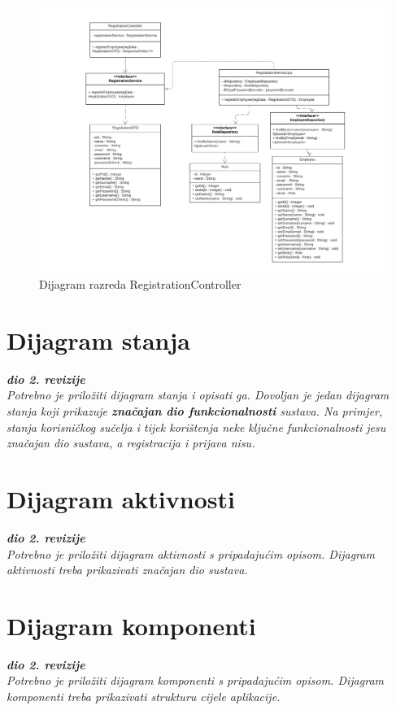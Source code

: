 			
			\eject
			\begin{figure}[H]
					\centering
					\includegraphics[width=\textwidth]{slike/fixRegistrationController.png}
					\caption{Dijagram razreda RegistrationController}
				\end{figure}
			
			
			\eject
			
		
		\section{Dijagram stanja}
			
			
			\textbf{\textit{dio 2. revizije}}\\
			
			\textit{Potrebno je priložiti dijagram stanja i opisati ga. Dovoljan je jedan dijagram stanja koji prikazuje \textbf{značajan dio funkcionalnosti} sustava. Na primjer, stanja korisničkog sučelja i tijek korištenja neke ključne funkcionalnosti jesu značajan dio sustava, a registracija i prijava nisu. }
			
			
			\eject 
		
		\section{Dijagram aktivnosti}
			
			\textbf{\textit{dio 2. revizije}}\\
			
			 \textit{Potrebno je priložiti dijagram aktivnosti s pripadajućim opisom. Dijagram aktivnosti treba prikazivati značajan dio sustava.}
			
			\eject
		\section{Dijagram komponenti}
		
			\textbf{\textit{dio 2. revizije}}\\
		
			 \textit{Potrebno je priložiti dijagram komponenti s pripadajućim opisom. Dijagram komponenti treba prikazivati strukturu cijele aplikacije.}